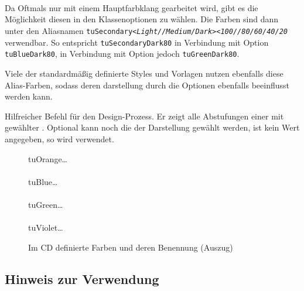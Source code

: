 \begin{Declaration}
  \\
  \\
  \\
\end{Declaration}

Da Oftmals nur mit einem Hauptfarbklang gearbeitet wird, gibt es die Möglichkeit
diesen in den Klassenoptionen zu wählen. Die Farben sind dann unter den
Aliasnamen
\texttt{tuSecondary\textit{<Light//Medium/Dark>}\textit{<100//80/60/40/20}}
verwendbar.
So entspricht \texttt{tuSecondaryDark80} in Verbindung mit Option
 \texttt{tuBlueDark80}, in Verbindung mit Option 
jedoch \texttt{tuGreenDark80}.

Viele der standardmäßig definierte Styles und Vorlagen nutzen ebenfalls diese
Alias-Farben, sodass deren darstellung durch die Optionen ebenfalls beeinflusst 
werden kann.

\begin{Declaration}
\end{Declaration}

Hilfreicher Befehl für den Design-Prozess. Er zeigt alle Abstufungen
einer   mit gewählter 
 .
Optional kann noch die  der Darstellung gewählt werden,
ist kein Wert angegeben, so wird  verwendet.

\begin{figure}
  tuOrange\ldots\\
  \\[-1ex]
  tuBlue\ldots\\
  \\[-1ex]
  tuGreen\ldots\\
  \\[-1ex]
  tuViolet\ldots\\
  \caption{Im CD definierte Farben und deren Benennung (Auszug)}
\end{figure}


\subsection{Hinweis zur Verwendung}

